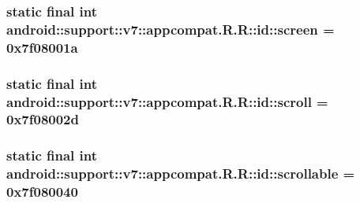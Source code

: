 \hypertarget{classandroid_1_1support_1_1v7_1_1appcompat_1_1_r_1_1id_295d9d8a114c45191be984373ee8ff25}{
\subsubsection[{screen}]{\setlength{\rightskip}{0pt plus 5cm}static final int android::support::v7::appcompat.R.R::id::screen = 0x7f08001a}}
\label{classandroid_1_1support_1_1v7_1_1appcompat_1_1_r_1_1id_295d9d8a114c45191be984373ee8ff25}


\hypertarget{classandroid_1_1support_1_1v7_1_1appcompat_1_1_r_1_1id_e0c395762b21ee44e926575f7b79d036}{
\subsubsection[{scroll}]{\setlength{\rightskip}{0pt plus 5cm}static final int android::support::v7::appcompat.R.R::id::scroll = 0x7f08002d}}
\label{classandroid_1_1support_1_1v7_1_1appcompat_1_1_r_1_1id_e0c395762b21ee44e926575f7b79d036}


\hypertarget{classandroid_1_1support_1_1v7_1_1appcompat_1_1_r_1_1id_f0120ee03747842d3ed2c225474b784d}{
\subsubsection[{scrollable}]{\setlength{\rightskip}{0pt plus 5cm}static final int android::support::v7::appcompat.R.R::id::scrollable = 0x7f080040}}
\label{classandroid_1_1support_1_1v7_1_1appcompat_1_1_r_1_1id_f0120ee03747842d3ed2c225474b784d}


